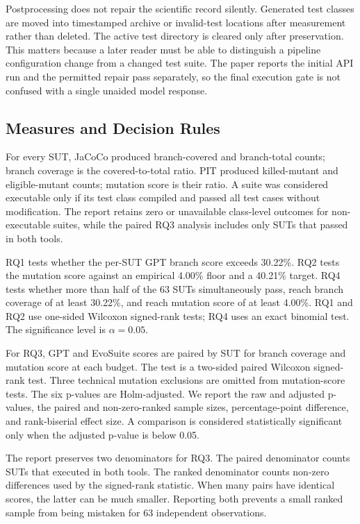 Postprocessing does not repair the scientific record silently. Generated test classes are moved into timestamped archive or invalid-test locations after measurement rather than deleted. The active test directory is cleared only after preservation. This matters because a later reader must be able to distinguish a pipeline configuration change from a changed test suite. The paper reports the initial API run and the permitted repair pass separately, so the final execution gate is not confused with a single unaided model response.

\subsection{Measures and Decision Rules}
For every SUT, JaCoCo produced branch-covered and branch-total counts; branch coverage is the covered-to-total ratio. PIT produced killed-mutant and eligible-mutant counts; mutation score is their ratio. A suite was considered executable only if its test class compiled and passed all test cases without modification. The report retains zero or unavailable class-level outcomes for non-executable suites, while the paired RQ3 analysis includes only SUTs that passed in both tools.

RQ1 tests whether the per-SUT GPT branch score exceeds 30.22\%. RQ2 tests the mutation score against an empirical 4.00\% floor and a 40.21\% target. RQ4 tests whether more than half of the 63 SUTs simultaneously pass, reach branch coverage of at least 30.22\%, and reach mutation score of at least 4.00\%. RQ1 and RQ2 use one-sided Wilcoxon signed-rank tests; RQ4 uses an exact binomial test. The significance level is $\alpha=0.05$.

For RQ3, GPT and EvoSuite scores are paired by SUT for branch coverage and mutation score at each budget. The test is a two-sided paired Wilcoxon signed-rank test. Three technical mutation exclusions are omitted from mutation-score tests. The six p-values are Holm-adjusted. We report the raw and adjusted p-values, the paired and non-zero-ranked sample sizes, percentage-point difference, and rank-biserial effect size. A comparison is considered statistically significant only when the adjusted p-value is below 0.05.

The report preserves two denominators for RQ3. The paired denominator counts SUTs that executed in both tools. The ranked denominator counts non-zero differences used by the signed-rank statistic. When many pairs have identical scores, the latter can be much smaller. Reporting both prevents a small ranked sample from being mistaken for 63 independent observations.

